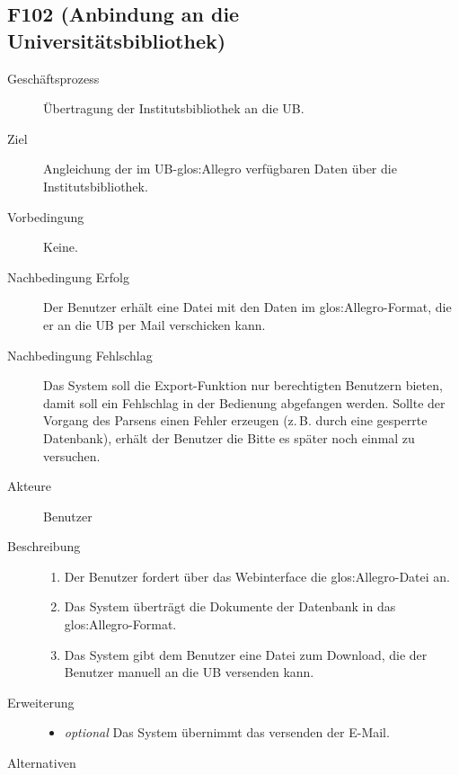 \subsection{F102 (Anbindung an die Universitätsbibliothek)}
\begin{description}
  \item[Geschäftsprozess]Übertragung der Institutsbibliothek an die \gls{UB}.
  \item[Ziel]Angleichung der im \gls{UB}-\gls{glos:Allegro} verfügbaren Daten über die Institutsbibliothek.
  \item[Vorbedingung]Keine.
  \item[Nachbedingung Erfolg]Der Benutzer erhält eine Datei mit den Daten im \gls{glos:Allegro}-Format, die er an die \gls{UB} per Mail verschicken kann.
  \item[Nachbedingung Fehlschlag]Das System soll die Export-Funktion nur berechtigten Benutzern bieten, damit soll ein Fehlschlag in der Bedienung abgefangen werden. Sollte der Vorgang des Parsens einen Fehler erzeugen (z.\,B. durch eine gesperrte Datenbank), erhält der Benutzer die Bitte es später noch einmal zu versuchen.
  \item[Akteure]Benutzer
  \item[Beschreibung]\hfill
    \begin{enumerate}
      \item Der Benutzer fordert über das Webinterface die \gls{glos:Allegro}-Datei an.
      \item Das System überträgt die Dokumente der Datenbank in das \gls{glos:Allegro}-Format.
      \item Das System gibt dem Benutzer eine Datei zum Download, die der Benutzer manuell an die \gls{UB} versenden kann.
    \end{enumerate}
  \item[Erweiterung]\hfill
    \begin{itemize}
      \item \emph{optional} Das System übernimmt das versenden der E-Mail.
    \end{itemize}
  \item[Alternativen]
\end{description}

